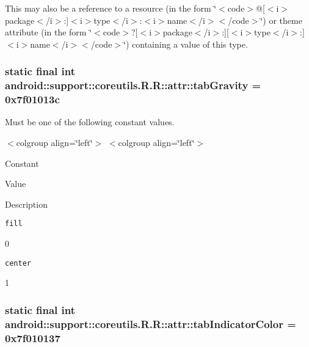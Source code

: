 This may also be a reference to a resource (in the form \char`\"{}$<$code$>$@\mbox{[}$<$i$>$package$<$/i$>$:\mbox{]}$<$i$>$type$<$/i$>$:$<$i$>$name$<$/i$>$$<$/code$>$\char`\"{}) or theme attribute (in the form \char`\"{}$<$code$>$?\mbox{[}$<$i$>$package$<$/i$>$:\mbox{]}\mbox{[}$<$i$>$type$<$/i$>$:\mbox{]}$<$i$>$name$<$/i$>$$<$/code$>$\char`\"{}) containing a value of this type. \hypertarget{classandroid_1_1support_1_1coreutils_1_1_r_1_1attr_212d311a831f8211b30aae71778489c1}{
\subsubsection[{tabGravity}]{\setlength{\rightskip}{0pt plus 5cm}static final int android::support::coreutils.R.R::attr::tabGravity = 0x7f01013c}}
\label{classandroid_1_1support_1_1coreutils_1_1_r_1_1attr_212d311a831f8211b30aae71778489c1}


Must be one of the following constant values. \begin{TabularC}{0}
\hline
\end{TabularC}
$<$colgroup align=\char`\"{}left\char`\"{}$>$ $<$colgroup align=\char`\"{}left\char`\"{}$>$ 

Constant

Value

Description 

{\tt fill}

0

{\tt center}

1\hypertarget{classandroid_1_1support_1_1coreutils_1_1_r_1_1attr_4767e58373c85c0559c5163f55a56377}{
\subsubsection[{tabIndicatorColor}]{\setlength{\rightskip}{0pt plus 5cm}static final int android::support::coreutils.R.R::attr::tabIndicatorColor = 0x7f010137}}
\label{classandroid_1_1support_1_1coreutils_1_1_r_1_1attr_4767e58373c85c0559c5163f55a56377}


